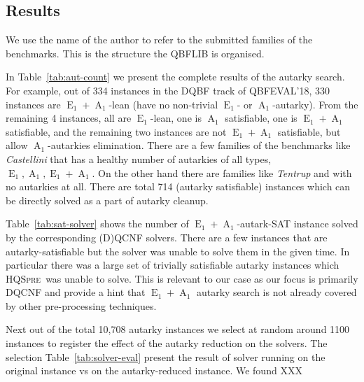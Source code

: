 \documentclass[runningheads]{llncs}
\DeclareMathOperator{\Aaut}{A}
\DeclareMathOperator{\Eaut}{E}
\newcommand{\hqspre}{\textsc{HQSpre}}
\begin{document}
\subsection{Results}
We use the name of the author to refer to the submitted families of the benchmarks. This is the structure the QBFLIB is organised.

In Table~\ref{tab:aut-count} we present the complete results of the autarky search. For example, out of 334 instances in the DQBF track of QBFEVAL'18, 330 instances are $\Eaut_1+\Aaut_1$-lean (have no non-trivial $\Eaut_1$- or $\Aaut_1$-autarky). From the remaining 4 instances, all are $\Eaut_1$-lean, one is $\Aaut_1$ satisfiable, one is $\Eaut_1+\Aaut_1$ satisfiable, and the remaining two instances are not $\Eaut_1+\Aaut_1$ satisfiable, but allow $\Aaut_1$-autarkies elimination.
%
There are a few families of the benchmarks like \textit{Castellini} that has a healthy number of autarkies of all types, $\Eaut_1,\Aaut_1,\Eaut_1+\Aaut_1$. On the other hand there are families like \textit{Tentrup} and  with no autarkies at all. There are total 714 (autarky satisfiable) instances which can be directly solved as a part of autarky cleanup.

Table~\ref{tab:sat-solver} shows the number of $\Eaut_1+\Aaut_1$-autark-SAT instance solved by the corresponding (D)QCNF solvers. There are a few instances that are autarky-satisfiable but the solver was unable to solve them in the given time. In particular there was a large set of trivially satisfiable autarky instances which \hqspre\ was unable to solve. This is relevant to our case as our focus is primarily DQCNF and provide a hint that $\Eaut_1+\Aaut_1$ autarky search is not already covered by other pre-processing techniques.

Next out of the total 10,708 autarky instances we select at random around 1100 instances to register the effect of the autarky reduction on the solvers. The selection
%
Table~\ref{tab:solver-eval} present the result of solver running on the original instance vs on the autarky-reduced instance. We found XXX

\end{document}
